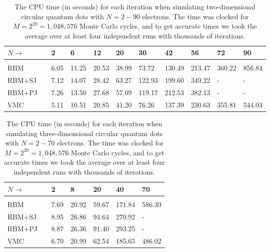\begin{table}[H]
	\caption{The CPU time (in seconds) for each iteration when simulating two-dimensional circular quantum dots with $N=2-90$ electrons. The time was clocked for $M=2^{20}=1,048,576$ Monte Carlo cycles, and to get accurate times we took the average over at least four independent runs with thousands of iterations.}
	\label{tab:cputime2D}
	\begin{tabularx}{\textwidth}{lR{0.3cm}R{0.9cm}R{1.1cm}R{1.1cm}R{1.1cm}R{1.1cm}R{1.1cm}R{1.1cm}R{1.1cm}R{1.1cm}} \hline\hline
		$N\rightarrow$ & \makecell{\\ \phantom{=}} & 2 & 6 & 12 & 20 & 30 & 42 & 56 & 72 & 90 \\ \hline \\
		RBM && 6.05 & 11.25 & 20.53 & 38.99 & 73.72 & 130.49 & 213.47 & 360.22 & 856.84 \\
		RBM+SJ && 7.12 & 14.07 & 28.42 & 63.27 & 122.93 & 199.60 & 349.22 & - & - \\
		RBM+PJ && 7.26 & 13.50 & 27.68 & 57.09 & 119.17 & 212.53 & 382.13 & - & - \\
		VMC && 5.11 & 10.51 & 20.85 & 41.20 & 76.26 & 137.39 & 230.63 & 355.81 & 544.03 \\ \hline \hline
	\end{tabularx}
\end{table}

\begin{table}[H]
	\caption{The CPU time (in seconds) for each iteration when simulating three-dimensional circular quantum dots with $N=2-70$ electrons. The time was clocked for $M=2^{20}=1,048,576$ Monte Carlo cycles, and to get accurate times we took the average over at least four independent runs with thousands of iterations.}
	\label{tab:cputime3D}
	\begin{tabularx}{\textwidth}{lrR{2.1cm}R{2.1cm}R{2.1cm}R{2.1cm}R{2.1cm}} \hline\hline
		$N\rightarrow$ & \makecell{\\ \phantom{=}} & 2 & 8 & 20 & 40 & 70 \\ \hline \\
		RBM && 7.69 & 20.92 & 59.67 & 171.84 & 586.39 \\
		RBM+SJ && 8.95 & 26.86 & 94.64 & 270.92 & - \\
		RBM+PJ && 8.87 & 26.36 & 91.40 & 293.25 & - \\
		VMC && 6.70 & 20.99 & 62.54 & 185.65 & 486.02 \\ \hline \hline
	\end{tabularx}
\end{table}

